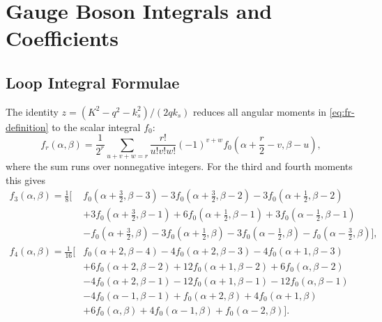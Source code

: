 \documentclass[a4paper,12pt]{article}
\begin{document}
\section{Gauge Boson Integrals and Coefficients}
\label{app:gauge}
\subsection{Loop Integral Formulae}
\label{app:appendix}
\label{app:loop-integrals}
The identity $z=(K^2-q^2-k_s^2)/(2qk_s)$ reduces all angular moments in \eqref{eq:fr-definition} to the scalar integral $f_0$:
\begin{equation}
    f_r(\alpha,\beta)=\frac1{2^r}
    \sum_{u+v+w=r}\frac{r!}{u!v!w!}(-1)^{v+w}
    f_0\left(\alpha+\frac r2-v,\beta-u\right),
    \label{eq:fr-finite-sum}
\end{equation}
where the sum runs over nonnegative integers.
For the third and fourth moments this gives
\begin{align}
    f_3(\alpha,\beta)=\frac18\Big[&
    f_0(\alpha+\tfrac32,\beta-3)
    -3f_0(\alpha+\tfrac32,\beta-2)
    -3f_0(\alpha+\tfrac12,\beta-2)\nonumber\\
    &+3f_0(\alpha+\tfrac32,\beta-1)
    +6f_0(\alpha+\tfrac12,\beta-1)
    +3f_0(\alpha-\tfrac12,\beta-1)\nonumber\\
    &-f_0(\alpha+\tfrac32,\beta)
    -3f_0(\alpha+\tfrac12,\beta)
    -3f_0(\alpha-\tfrac12,\beta)
    -f_0(\alpha-\tfrac32,\beta)\Big],
    \label{eq:f3}\\[1mm]
    f_4(\alpha,\beta)=\frac1{16}\Big[&
    f_0(\alpha+2,\beta-4)
    -4f_0(\alpha+2,\beta-3)-4f_0(\alpha+1,\beta-3)\nonumber\\
    &+6f_0(\alpha+2,\beta-2)+12f_0(\alpha+1,\beta-2)
    +6f_0(\alpha,\beta-2)\nonumber\\
    &-4f_0(\alpha+2,\beta-1)-12f_0(\alpha+1,\beta-1)
    -12f_0(\alpha,\beta-1)\nonumber\\
    &-4f_0(\alpha-1,\beta-1)
    +f_0(\alpha+2,\beta)+4f_0(\alpha+1,\beta)\nonumber\\
    &+6f_0(\alpha,\beta)+4f_0(\alpha-1,\beta)
    +f_0(\alpha-2,\beta)\Big].
    \label{eq:f4}
\end{align}
\end{document}
